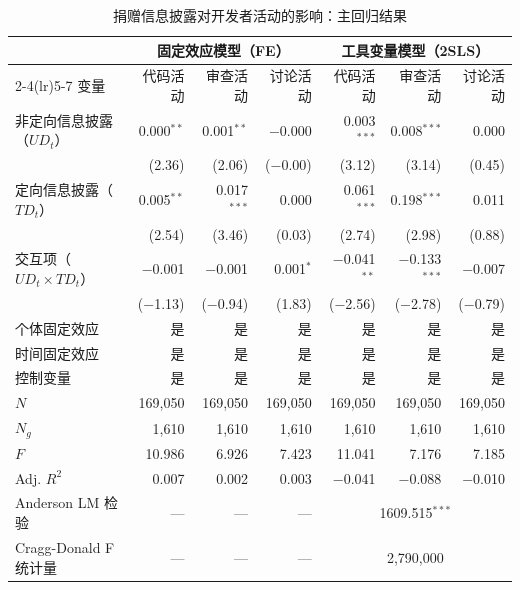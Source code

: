 \begin{table}[htbp]
    \centering
    \caption{捐赠信息披露对开发者活动的影响：主回归结果}
    \label{tab:main-results}
    \small
    \begin{tabularx}{\textwidth}{Xrrrrrr}
        \toprule
        & \multicolumn{3}{c}{固定效应模型（FE）}
        & \multicolumn{3}{c}{工具变量模型（2SLS）} \\
        \cmidrule(lr){2-4}\cmidrule(lr){5-7}
        变量
            & 代码活动 & 审查活动 & 讨论活动
            & 代码活动 & 审查活动 & 讨论活动 \\
        \midrule
        非定向信息披露（$UD_t$）
            & 0.000$^{**}$  & 0.001$^{**}$  & $-$0.000
            & 0.003$^{***}$ & 0.008$^{***}$ & 0.000 \\
            & (2.36)        & (2.06)        & ($-$0.00)
            & (3.12)        & (3.14)        & (0.45) \\[0.4em]
        定向信息披露（$TD_t$）
            & 0.005$^{**}$  & 0.017$^{***}$ & 0.000
            & 0.061$^{***}$ & 0.198$^{***}$ & 0.011 \\
            & (2.54)        & (3.46)        & (0.03)
            & (2.74)        & (2.98)        & (0.88) \\[0.4em]
        交互项（$UD_t \times TD_t$）
            & $-$0.001      & $-$0.001      & 0.001$^{*}$
            & $-$0.041$^{**}$ & $-$0.133$^{***}$ & $-$0.007 \\
            & ($-$1.13)     & ($-$0.94)     & (1.83)
            & ($-$2.56)     & ($-$2.78)     & ($-$0.79) \\[0.4em]
        \midrule
        个体固定效应 & 是 & 是 & 是 & 是 & 是 & 是 \\
        时间固定效应 & 是 & 是 & 是 & 是 & 是 & 是 \\
        控制变量     & 是 & 是 & 是 & 是 & 是 & 是 \\
        \midrule
        $N$         & 169,050 & 169,050 & 169,050 & 169,050 & 169,050 & 169,050 \\
        $N_g$       & 1,610   & 1,610   & 1,610   & 1,610   & 1,610   & 1,610 \\
        $F$         & 10.986  & 6.926   & 7.423   & 11.041  & 7.176   & 7.185 \\
        Adj. $R^2$  & 0.007   & 0.002   & 0.003   & $-$0.041 & $-$0.088 & $-$0.010 \\
        Anderson LM 检验    & --- & --- & --- & \multicolumn{3}{c}{1609.515$^{***}$} \\
        Cragg-Donald F 统计量 & --- & --- & --- & \multicolumn{3}{c}{2,790,000} \\

\end{tabularx}
\end{table}
